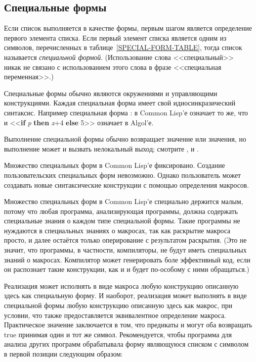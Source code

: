 \subsection{Специальные формы}

Если список выполняется в качестве формы, первым шагом является определение
первого элемента списка. Если первый элемент списка является одним из символов,
перечисленных в таблице~\ref{SPECIAL-FORM-TABLE}, тогда список называется
\emph{специальной формой}. (Использование слова <<специальный>> никак не
связано с использованием этого слова в фразе <<специальная переменная>>.)

Специальные формы обычно являются окружениями и управляющими конструкциями.
Каждая специальная форма имеет свой идиосинкразический синтаксис. Например
специальная форма :
 в Common Lisp'е означает то же, что и
<<\textbf{if} \emph{p} \textbf{then} \emph{x}+4 \textbf{else} 5>> означает в
Algol'е.

Выполнение специальной формы обычно возвращает значение или значения, но
выполнение может и вызвать нелокальный выход; смотрите ,
 и .

Множество специальных форм в Common Lisp'е фиксировано. Создание
пользовательских специальных форм невозможно. Однако пользователь может
создавать новые синтаксические конструкции с помощью определения макросов.

Множество специальных форм в Common Lisp'е специально держится малым, потому что
любая программа, анализирующая программы, должна содержать специальные знания о
каждом типе специальной формы. Такие программы не нуждаются в специальных
знаниях о макросах, так как раскрытие макроса просто, и далее остаётся только
оперирование с результатом раскрытия. (Это не значит, что программы, в
частности, компиляторы, не будут иметь специальных знаний о макросах. Компилятор
может генерировать боле эффективный код, если он распознает такие конструкции, как
 и  и будет по-особому с ними обращаться.)

Реализация может исполнять в виде макроса любую конструкцию описанную здесь как
специальную форму. И наоборот, реализация может выполнять в виде специальной
формы любую конструкцию описанную здесь как макрос, при условии, что также 
предоставляется эквивалентное определение макроса.
Практическое значение заключается в том, что предикаты  и
 могут оба возвращать true принимая один и тот же символ.
Рекомендуется, чтобы программа для анализа других программ обрабатывала форму
являющуюся списком с символом в первой позиции следующим образом:

